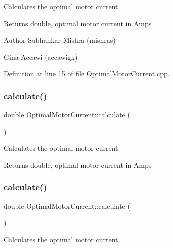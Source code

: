 Calculates the optimal motor current

\begin{DoxyReturn}{Returns}
double, optimal motor current in Amps
\end{DoxyReturn}
\begin{DoxyAuthor}{Author}
Subhankar Mishra (mishras) 

Gina Accawi (accawigk) 
\end{DoxyAuthor}


Definition at line 15 of file Optimal\+Motor\+Current.\+cpp.

\mbox{\label{class_optimal_motor_current_af2dcf21026f526901ccf2927affecd49}} 
\subsubsection{\texorpdfstring{calculate()}{calculate()}\hspace{0.1cm}{\footnotesize\ttfamily [2/3]}}
{\footnotesize\ttfamily double Optimal\+Motor\+Current\+::calculate (\begin{DoxyParamCaption}{ }\end{DoxyParamCaption})}

Calculates the optimal motor current

\begin{DoxyReturn}{Returns}
double, optimal motor current in Amps 
\end{DoxyReturn}
\mbox{\label{class_optimal_motor_current_af2dcf21026f526901ccf2927affecd49}} 
\subsubsection{\texorpdfstring{calculate()}{calculate()}\hspace{0.1cm}{\footnotesize\ttfamily [3/3]}}
{\footnotesize\ttfamily double Optimal\+Motor\+Current\+::calculate (\begin{DoxyParamCaption}{ }\end{DoxyParamCaption})}

Calculates the optimal motor current


